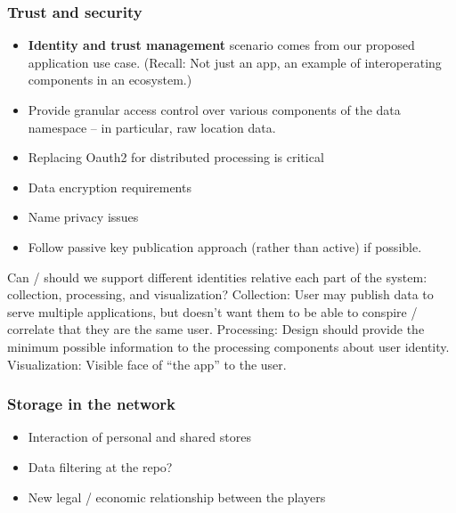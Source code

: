 \subsubsection{Trust and security}
\begin{itemize}
\item \textbf{Identity and trust management} scenario comes from our proposed application use case.  (Recall:  Not just an app, an example of interoperating components in an ecosystem.)
\item Provide granular access control over various components of the data namespace – in particular, raw location data. 
\item Replacing Oauth2 for distributed processing is critical
\item Data encryption requirements
\item Name privacy issues
\item Follow passive key publication approach (rather than active) if possible. 
\end{itemize}
Can / should we support different identities relative each part of the system: collection, processing, and visualization?
Collection: User may publish data to serve multiple applications, but doesn’t want them to be able to conspire / correlate that they are the same user.
Processing:  Design should provide the minimum possible information to the processing components about user identity. 
Visualization: Visible face of “the app” to the user. 

\subsubsection{Storage in the network}
\begin{itemize}
\item Interaction of personal and shared stores
\item Data filtering at the repo?
\item New legal / economic relationship between the players
\end{itemize}
